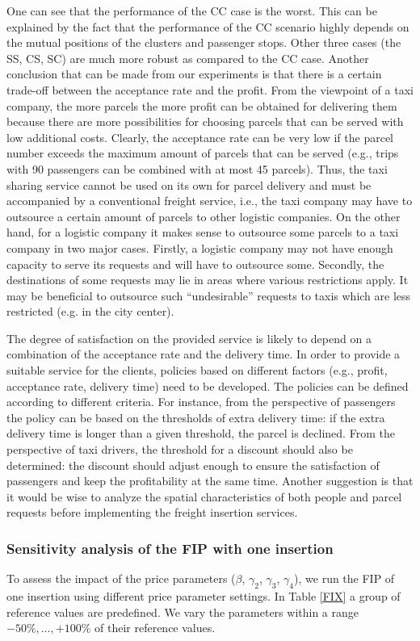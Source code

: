 \documentclass[preprint,authoryear,12pt]{elsarticle}
\begin{document}
One can see that the performance of the CC case is the worst. This can be explained by the fact that the performance of the CC scenario highly depends on the mutual positions of the clusters and passenger stops. Other three cases (the SS, CS, SC) are much more robust as compared to the CC case. Another conclusion that can be made from our experiments is that there is a certain trade-off between the acceptance rate and the profit. From the viewpoint of a taxi company, the more parcels the more profit can be obtained for delivering them because there are more possibilities for choosing parcels that can be served with low additional costs. Clearly, the acceptance rate can be very low if the parcel number exceeds the maximum amount of parcels that can be served  (e.g., trips  with 90 passengers can be combined with at most 45 parcels). Thus, the taxi sharing service cannot be used on its own for parcel delivery and must be accompanied by a conventional freight service, i.e., the taxi company may have to outsource a certain amount of parcels to other logistic companies. On the other hand, for a logistic company it makes sense to outsource some parcels to a taxi company in two major cases. Firstly, a logistic company may not have enough capacity to serve its requests and will have to outsource some. Secondly, the destinations of some requests may lie in areas where various restrictions apply. It may be beneficial to outsource such ``undesirable'' requests to taxis which are less restricted (e.g. in the city center).

The degree of satisfaction on the provided service is likely to depend on a combination of the acceptance rate and the delivery time. In order to provide a suitable service for the clients, policies based on different factors (e.g., profit, acceptance rate, delivery time) need to be developed. The policies can be defined according to different criteria. For instance, from the perspective of passengers the policy can be based on the thresholds of extra delivery time: if the extra delivery time is longer than a given threshold, the parcel is declined. From the perspective of taxi drivers, the threshold for a discount should also be determined: the discount should adjust enough to ensure the satisfaction of passengers and keep the profitability at the same time.  Another suggestion is that it would be wise to analyze the spatial characteristics of both people and parcel requests before implementing the freight insertion services.


\subsubsection{Sensitivity analysis of the FIP with one insertion}
To assess the impact of the price parameters ($\beta$, $\gamma_2$, $\gamma_3$, $\gamma_4$), we run the FIP of one insertion using different price parameter settings. In Table \ref{FIX} a group of reference values are predefined. We vary the parameters within a range $-50\%,\dots,+100\%$  of their reference values.
\end{document}
